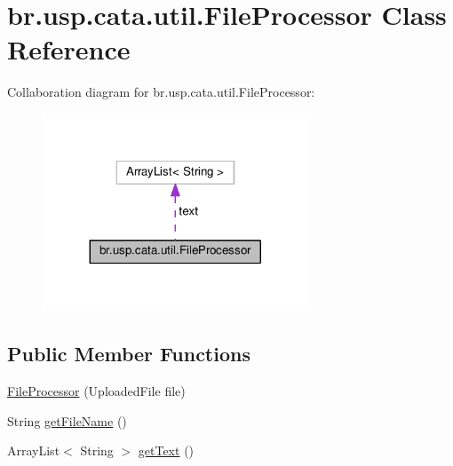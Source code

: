 \hypertarget{classbr_1_1usp_1_1cata_1_1util_1_1_file_processor}{\section{br.\+usp.\+cata.\+util.\+File\+Processor Class Reference}
\label{classbr_1_1usp_1_1cata_1_1util_1_1_file_processor}
}


Collaboration diagram for br.\+usp.\+cata.\+util.\+File\+Processor\+:\nopagebreak
\begin{figure}[H]
\begin{center}
\leavevmode
\includegraphics[width=224pt]{classbr_1_1usp_1_1cata_1_1util_1_1_file_processor__coll__graph}
\end{center}
\end{figure}
\subsection*{Public Member Functions}
\begin{DoxyCompactItemize}
\item 
\hyperlink{classbr_1_1usp_1_1cata_1_1util_1_1_file_processor_ae57a4e749023c3b6e82ed1f6c88a7e49}{File\+Processor} (Uploaded\+File file)
\item 
String \hyperlink{classbr_1_1usp_1_1cata_1_1util_1_1_file_processor_adfcaacf72918695ba421f7aec4371f49}{get\+File\+Name} ()
\item 
Array\+List$<$ String $>$ \hyperlink{classbr_1_1usp_1_1cata_1_1util_1_1_file_processor_a12a2ab4563b4123175d8e7da7d395733}{get\+Text} ()
\end{DoxyCompactItemize}
